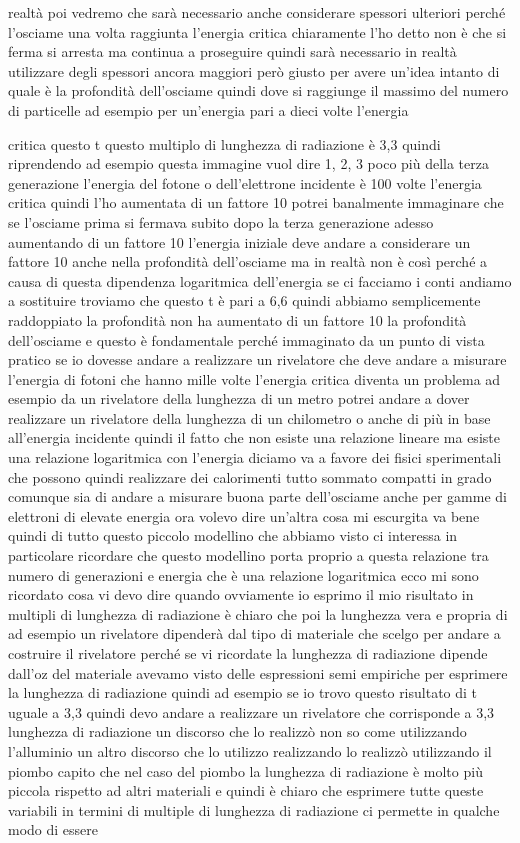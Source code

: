 {realtà poi vedremo che sarà necessario anche considerare spessori ulteriori perché l'osciame una volta raggiunta l'energia critica chiaramente l'ho detto non è che si ferma si arresta ma continua a proseguire quindi sarà necessario in realtà utilizzare degli spessori ancora maggiori però giusto per avere un'idea intanto di quale è la profondità dell'osciame quindi dove si raggiunge il massimo del numero di particelle ad esempio per un'energia pari a dieci volte l'energia 

critica questo t questo multiplo di lunghezza di radiazione è 3,3 quindi riprendendo ad esempio questa immagine vuol dire 1, 2, 3 poco più della terza generazione l'energia del fotone o dell'elettrone incidente è 100 volte l'energia critica quindi l'ho aumentata di un fattore 10 potrei banalmente immaginare che se l'osciame prima si fermava subito dopo la terza generazione adesso aumentando di un fattore 10 l'energia iniziale deve andare a considerare un fattore 10 anche nella profondità dell'osciame ma in realtà non è così perché a causa di questa dipendenza logaritmica dell'energia se ci facciamo i conti andiamo a sostituire troviamo che questo t è pari a 6,6 quindi abbiamo semplicemente raddoppiato la profondità non ha aumentato di un fattore 10 la profondità dell'osciame e questo è fondamentale perché immaginato da un punto di vista pratico se io dovesse andare a realizzare un rivelatore che deve andare a misurare l'energia di fotoni che hanno mille volte l'energia critica diventa un problema ad esempio da un rivelatore della lunghezza di un metro potrei andare a dover realizzare un rivelatore della lunghezza di un chilometro o anche di più in base all'energia incidente quindi il fatto che non esiste una relazione lineare ma esiste una relazione logaritmica con l'energia diciamo va a favore dei fisici sperimentali che possono quindi realizzare dei calorimenti tutto sommato compatti in grado comunque sia di andare a misurare buona parte dell'osciame anche per gamme di elettroni di elevate energia ora volevo dire un'altra cosa mi escurgita va bene quindi di tutto questo piccolo modellino che abbiamo visto ci interessa in particolare ricordare che questo modellino porta proprio a questa relazione tra numero di generazioni e energia che è una relazione logaritmica ecco mi sono ricordato cosa vi devo dire quando ovviamente io esprimo il mio risultato in multipli di lunghezza di radiazione è chiaro che poi la lunghezza vera e propria di ad esempio un rivelatore dipenderà dal tipo di materiale che scelgo per andare a costruire il rivelatore perché se vi ricordate la lunghezza di radiazione dipende dall'oz del materiale avevamo visto delle espressioni semi empiriche per esprimere la lunghezza di radiazione quindi ad esempio se io trovo questo risultato di t uguale a 3,3 quindi devo andare a realizzare un rivelatore che corrisponde a 3,3 lunghezza di radiazione un discorso che lo realizzò non so come utilizzando l'alluminio un altro discorso che lo utilizzo realizzando lo realizzò utilizzando il piombo capito che nel caso del piombo la lunghezza di radiazione è molto più piccola rispetto ad altri materiali e quindi è chiaro che esprimere tutte queste variabili in termini di multiple di lunghezza di radiazione ci permette in qualche modo di essere }
